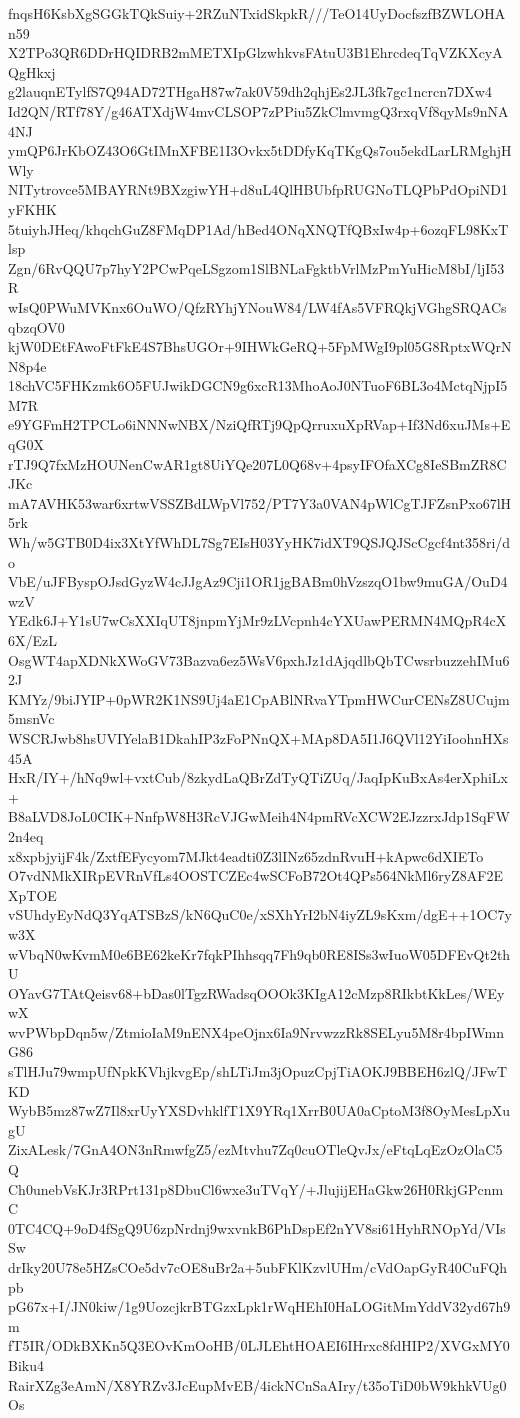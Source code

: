 fnqsH6KsbXgSGGkTQkSuiy+2RZuNTxidSkpkR///TeO14UyDocfszfBZWLOHAn59
X2TPo3QR6DDrHQIDRB2mMETXIpGlzwhkvsFAtuU3B1EhrcdeqTqVZKXcyAQgHkxj
g2lauqnETylfS7Q94AD72THgaH87w7ak0V59dh2qhjEs2JL3fk7gc1ncrcn7DXw4
Id2QN/RTf78Y/g46ATXdjW4mvCLSOP7zPPiu5ZkClmvmgQ3rxqVf8qyMs9nNA4NJ
ymQP6JrKbOZ43O6GtIMnXFBE1I3Ovkx5tDDfyKqTKgQs7ou5ekdLarLRMghjHWly
NITytrovce5MBAYRNt9BXzgiwYH+d8uL4QlHBUbfpRUGNoTLQPbPdOpiND1yFKHK
5tuiyhJHeq/khqchGuZ8FMqDP1Ad/hBed4ONqXNQTfQBxIw4p+6ozqFL98KxTlsp
Zgn/6RvQQU7p7hyY2PCwPqeLSgzom1SlBNLaFgktbVrlMzPmYuHicM8bI/ljI53R
wIsQ0PWuMVKnx6OuWO/QfzRYhjYNouW84/LW4fAs5VFRQkjVGhgSRQACsqbzqOV0
kjW0DEtFAwoFtFkE4S7BhsUGOr+9IHWkGeRQ+5FpMWgI9pl05G8RptxWQrNN8p4e
18chVC5FHKzmk6O5FUJwikDGCN9g6xcR13MhoAoJ0NTuoF6BL3o4MctqNjpI5M7R
e9YGFmH2TPCLo6iNNNwNBX/NziQfRTj9QpQrruxuXpRVap+If3Nd6xuJMs+EqG0X
rTJ9Q7fxMzHOUNenCwAR1gt8UiYQe207L0Q68v+4psyIFOfaXCg8IeSBmZR8CJKc
mA7AVHK53war6xrtwVSSZBdLWpVl752/PT7Y3a0VAN4pWlCgTJFZsnPxo67lH5rk
Wh/w5GTB0D4ix3XtYfWhDL7Sg7EIsH03YyHK7idXT9QSJQJScCgcf4nt358ri/do
VbE/uJFByspOJsdGyzW4cJJgAz9Cji1OR1jgBABm0hVzszqO1bw9muGA/OuD4wzV
YEdk6J+Y1sU7wCsXXIqUT8jnpmYjMr9zLVcpnh4cYXUawPERMN4MQpR4cX6X/EzL
OsgWT4apXDNkXWoGV73Bazva6ez5WsV6pxhJz1dAjqdlbQbTCwsrbuzzehIMu62J
KMYz/9biJYIP+0pWR2K1NS9Uj4aE1CpABlNRvaYTpmHWCurCENsZ8UCujm5msnVc
WSCRJwb8hsUVIYelaB1DkahIP3zFoPNnQX+MAp8DA5I1J6QVl12YiIoohnHXs45A
HxR/IY+/hNq9wl+vxtCub/8zkydLaQBrZdTyQTiZUq/JaqIpKuBxAs4erXphiLx+
B8aLVD8JoL0CIK+NnfpW8H3RcVJGwMeih4N4pmRVcXCW2EJzzrxJdp1SqFW2n4eq
x8xpbjyijF4k/ZxtfEFycyom7MJkt4eadti0Z3lINz65zdnRvuH+kApwc6dXIETo
O7vdNMkXIRpEVRnVfLs4OOSTCZEc4wSCFoB72Ot4QPs564NkMl6ryZ8AF2EXpTOE
vSUhdyEyNdQ3YqATSBzS/kN6QuC0e/xSXhYrI2bN4iyZL9sKxm/dgE++1OC7yw3X
wVbqN0wKvmM0e6BE62keKr7fqkPIhhsqq7Fh9qb0RE8ISs3wIuoW05DFEvQt2thU
OYavG7TAtQeisv68+bDas0lTgzRWadsqOOOk3KIgA12cMzp8RIkbtKkLes/WEywX
wvPWbpDqn5w/ZtmioIaM9nENX4peOjnx6Ia9NrvwzzRk8SELyu5M8r4bpIWmnG86
sTlHJu79wmpUfNpkKVhjkvgEp/shLTiJm3jOpuzCpjTiAOKJ9BBEH6zlQ/JFwTKD
WybB5mz87wZ7Il8xrUyYXSDvhklfT1X9YRq1XrrB0UA0aCptoM3f8OyMesLpXugU
ZixALesk/7GnA4ON3nRmwfgZ5/ezMtvhu7Zq0cuOTleQvJx/eFtqLqEzOzOlaC5Q
Ch0unebVsKJr3RPrt131p8DbuCl6wxe3uTVqY/+JlujijEHaGkw26H0RkjGPcnmC
0TC4CQ+9oD4fSgQ9U6zpNrdnj9wxvnkB6PhDspEf2nYV8si61HyhRNOpYd/VIsSw
drIky20U78e5HZsCOe5dv7cOE8uBr2a+5ubFKlKzvlUHm/cVdOapGyR40CuFQhpb
pG67x+I/JN0kiw/1g9UozcjkrBTGzxLpk1rWqHEhI0HaLOGitMmYddV32yd67h9m
fT5IR/ODkBXKn5Q3EOvKmOoHB/0LJLEhtHOAEI6IHrxc8fdHIP2/XVGxMY0Biku4
RairXZg3eAmN/X8YRZv3JcEupMvEB/4ickNCnSaAIry/t35oTiD0bW9khkVUg0Os
